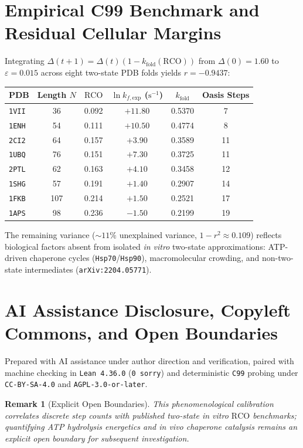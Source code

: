 \documentclass[11pt,a4paper]{article}
\newtheorem{remark}{Remark}
\begin{document}
\section{Empirical C99 Benchmark and Residual Cellular Margins}
Integrating $\Delta(t+1) = \Delta(t)(1 - k_{\mathrm{fold}}(\mathrm{RCO}))$ from $\Delta(0) = 1.60$ to $\varepsilon = 0.015$ across eight two-state PDB folds yields $r = -0.9437$:
\begin{center}
\begin{tabular}{lccccc}
\toprule
\textbf{PDB} & \textbf{Length $N$} & $\mathrm{RCO}$ & $\ln k_{f,\mathrm{exp}}$ ($\mathrm{s}^{-1}$) & $k_{\mathrm{fold}}$ & \textbf{Oasis Steps} \\
\midrule
\texttt{1VII} & 36 & 0.092 & $+11.80$ & 0.5370 & 7 \\
\texttt{1ENH} & 54 & 0.111 & $+10.50$ & 0.4774 & 8 \\
\texttt{2CI2} & 64 & 0.157 & $+3.90$ & 0.3589 & 11 \\
\texttt{1UBQ} & 76 & 0.151 & $+7.30$ & 0.3725 & 11 \\
\texttt{2PTL} & 62 & 0.163 & $+4.10$ & 0.3458 & 12 \\
\texttt{1SHG} & 57 & 0.191 & $+1.40$ & 0.2907 & 14 \\
\texttt{1FKB} & 107 & 0.214 & $+1.50$ & 0.2521 & 17 \\
\texttt{1APS} & 98 & 0.236 & $-1.50$ & 0.2199 & 19 \\
\bottomrule
\end{tabular}
\end{center}
The remaining variance ($\sim 11\%$ unexplained variance, $1 - r^2 \approx 0.109$) reflects biological factors absent from isolated \emph{in vitro} two-state approximations: ATP-driven chaperone cycles (\texttt{Hsp70}/\texttt{Hsp90}), macromolecular crowding, and non-two-state intermediates (\texttt{arXiv:2204.05771}).

\section*{AI Assistance Disclosure, Copyleft Commons, and Open Boundaries}
Prepared with AI assistance under author direction and verification, paired with machine checking in \texttt{Lean~4.36.0} (\texttt{0~sorry}) and deterministic \texttt{C99} probing under \texttt{CC-BY-SA-4.0} and \texttt{AGPL-3.0-or-later}.

\begin{remark}[Explicit Open Boundaries]
This phenomenological calibration correlates discrete step counts with published two-state \emph{in vitro} $\mathrm{RCO}$ benchmarks; quantifying ATP hydrolysis energetics and \emph{in vivo} chaperone catalysis remains an explicit open boundary for subsequent investigation.
\end{remark}
\end{document}
